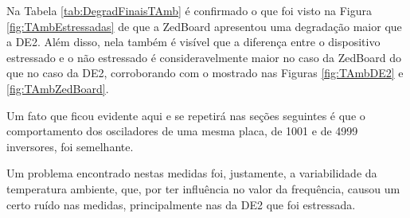 



Na Tabela \ref{tab:DegradFinaisTAmb} é confirmado o que foi visto na Figura \ref{fig:TAmbEstressadas} de que a ZedBoard apresentou uma degradação maior que a DE2. Além disso, nela também é visível que a diferença entre o dispositivo estressado e o não estressado é consideravelmente maior no caso da ZedBoard do que no caso da DE2, corroborando com o mostrado nas Figuras \ref{fig:TAmbDE2} e \ref{fig:TAmbZedBoard}.

Um fato que ficou evidente aqui e se repetirá nas seções seguintes é que o comportamento dos osciladores de uma mesma placa, de 1001 e de 4999 inversores, foi semelhante.

Um problema encontrado nestas medidas foi, justamente, a variabilidade da temperatura ambiente, que, por ter influência no valor da frequência, causou um certo ruído nas medidas, principalmente nas da DE2 que foi estressada.